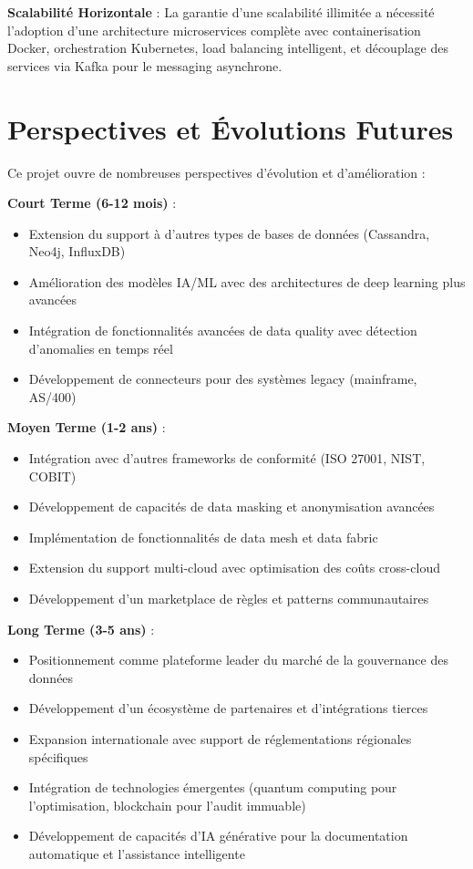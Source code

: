 \textbf{Scalabilité Horizontale} : La garantie d'une scalabilité illimitée a nécessité l'adoption d'une architecture microservices complète avec containerisation Docker, orchestration Kubernetes, load balancing intelligent, et découplage des services via Kafka pour le messaging asynchrone.

\section*{Perspectives et Évolutions Futures}

Ce projet ouvre de nombreuses perspectives d'évolution et d'amélioration :

\textbf{Court Terme (6-12 mois)} :
\begin{itemize}
    \item Extension du support à d'autres types de bases de données (Cassandra, Neo4j, InfluxDB)
    \item Amélioration des modèles IA/ML avec des architectures de deep learning plus avancées
    \item Intégration de fonctionnalités avancées de data quality avec détection d'anomalies en temps réel
    \item Développement de connecteurs pour des systèmes legacy (mainframe, AS/400)
\end{itemize}

\textbf{Moyen Terme (1-2 ans)} :
\begin{itemize}
    \item Intégration avec d'autres frameworks de conformité (ISO 27001, NIST, COBIT)
    \item Développement de capacités de data masking et anonymisation avancées
    \item Implémentation de fonctionnalités de data mesh et data fabric
    \item Extension du support multi-cloud avec optimisation des coûts cross-cloud
    \item Développement d'un marketplace de règles et patterns communautaires
\end{itemize}

\textbf{Long Terme (3-5 ans)} :
\begin{itemize}
    \item Positionnement comme plateforme leader du marché de la gouvernance des données
    \item Développement d'un écosystème de partenaires et d'intégrations tierces
    \item Expansion internationale avec support de réglementations régionales spécifiques
    \item Intégration de technologies émergentes (quantum computing pour l'optimisation, blockchain pour l'audit immuable)
    \item Développement de capacités d'IA générative pour la documentation automatique et l'assistance intelligente
\end{itemize}

